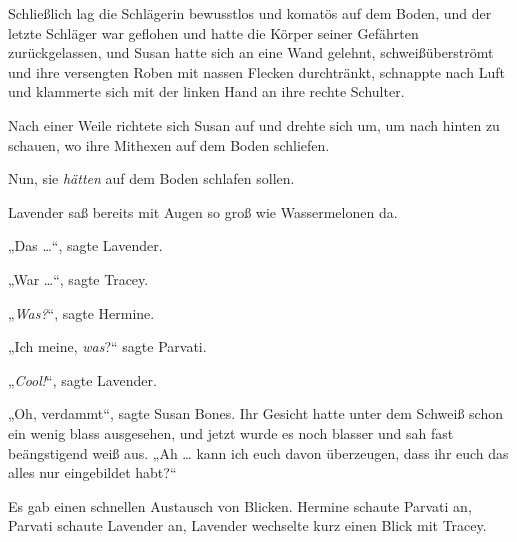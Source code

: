 Schließlich lag die Schlägerin bewusstlos und komatös auf dem Boden, und der letzte Schläger war geflohen und hatte die Körper seiner Gefährten zurückgelassen, und Susan hatte sich an eine Wand gelehnt, schweißüberströmt und ihre versengten Roben mit nassen Flecken durchtränkt, schnappte nach Luft und klammerte sich mit der linken Hand an ihre rechte Schulter.

Nach einer Weile richtete sich Susan auf und drehte sich um, um nach hinten zu schauen, wo ihre Mithexen auf dem Boden schliefen.

Nun, sie \emph{hätten} auf dem Boden schlafen sollen.

Lavender saß bereits mit Augen so groß wie Wassermelonen da.

„Das …“, sagte Lavender.

„War …“, sagte Tracey.

„\emph{Was?}“, sagte Hermine.

„Ich meine, \emph{was}?“ sagte Parvati.

„\emph{Cool!}“, sagte Lavender.

„Oh, verdammt“, sagte Susan Bones. Ihr Gesicht hatte unter dem Schweiß schon ein wenig blass ausgesehen, und jetzt wurde es noch blasser und sah fast beängstigend weiß aus.
„Ah … kann ich euch davon überzeugen, dass ihr euch das alles nur eingebildet habt?“

Es gab einen schnellen Austausch von Blicken. Hermine schaute Parvati an, Parvati schaute Lavender an, Lavender wechselte kurz einen Blick mit Tracey.

